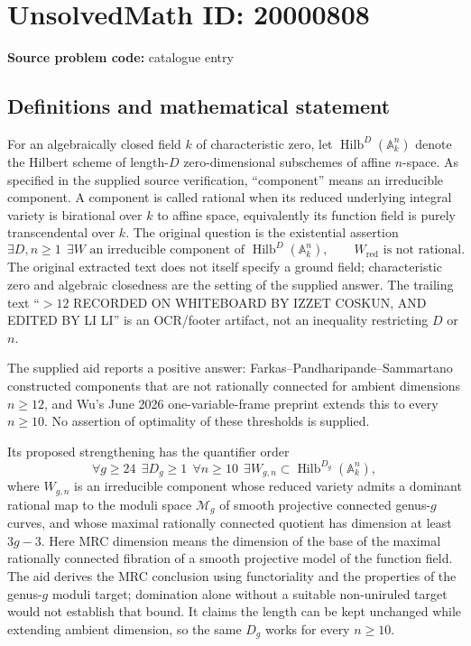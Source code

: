 \documentclass[11pt]{article}
\newcommand{\A}{\mathbb{A}}
\begin{document}
\section*{UnsolvedMath ID: 20000808}
\textbf{Source problem code:} catalogue entry
\subsection{Definitions and mathematical statement}
For an algebraically closed field \(k\) of characteristic zero, let \(\operatorname{Hilb}^{D}(\A_k^n)\) denote the Hilbert scheme of length-\(D\) zero-dimensional subschemes of affine \(n\)-space. As specified in the supplied source verification, ``component'' means an irreducible component. A component is called rational when its reduced underlying integral variety is birational over \(k\) to affine space, equivalently its function field is purely transcendental over \(k\). The original question is the existential assertion
\[
 \exists D,n\ge1\ \ \exists W\text{ an irreducible component of }
 \operatorname{Hilb}^{D}(\A_k^n),\qquad W_{\mathrm{red}}\text{ is not rational}.
\]
The original extracted text does not itself specify a ground field; characteristic zero and algebraic closedness are the setting of the supplied answer. The trailing text ``\(>12\) RECORDED ON WHITEBOARD BY IZZET COSKUN, AND EDITED BY LI LI'' is an OCR/footer artifact, not an inequality restricting \(D\) or \(n\).

The supplied aid reports a positive answer: Farkas--Pandharipande--Sammartano constructed components that are not rationally connected for ambient dimensions \(n\ge12\), and Wu's June 2026 one-variable-frame preprint extends this to every \(n\ge10\). No assertion of optimality of these thresholds is supplied.

Its proposed strengthening has the quantifier order
\[
 \forall g\ge24\ \ \exists D_g\ge1\ \ \forall n\ge10\ \ \exists W_{g,n}
 \subset\operatorname{Hilb}^{D_g}(\A_k^n),
\]
where \(W_{g,n}\) is an irreducible component whose reduced variety admits a dominant rational map to the moduli space \(\mathcal M_g\) of smooth projective connected genus-\(g\) curves, and whose maximal rationally connected quotient has dimension at least \(3g-3\). Here MRC dimension means the dimension of the base of the maximal rationally connected fibration of a smooth projective model of the function field. The aid derives the MRC conclusion using functoriality and the properties of the genus-\(g\) moduli target; domination alone without a suitable non-uniruled target would not establish that bound. It claims the length can be kept unchanged while extending ambient dimension, so the same \(D_g\) works for every \(n\ge10\).
\end{document}
